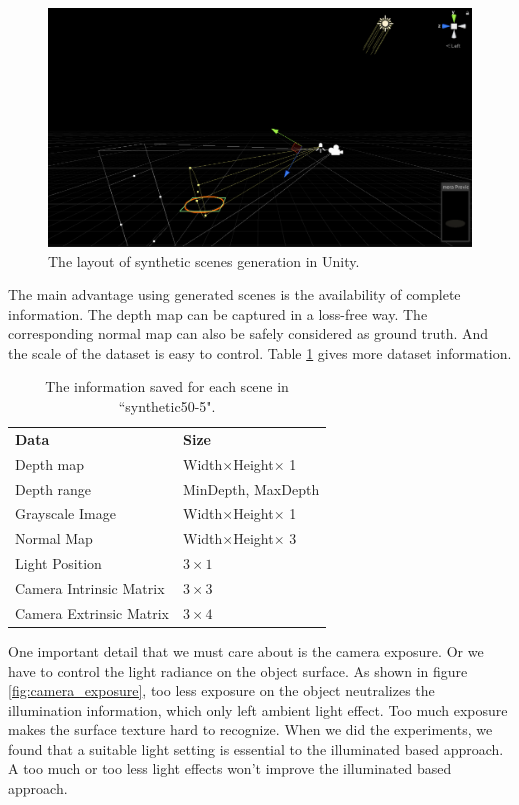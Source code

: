 \documentclass[border=15pt, multi, tikz]{article}
\newcommand{\tabhead}[1]{\textbf{#1}}
\begin{document}
\begin{figure}[h!]
	\centering
	\includegraphics[width=.99\textwidth]{./Figures/unity-workplace.PNG}
	\caption{The layout of synthetic scenes generation in Unity.}
	\label{fig:unity-workplace}
\end{figure}

The main advantage using generated scenes is the availability of complete information. The depth map can be captured in a loss-free way. The corresponding normal map can also be safely considered as ground truth. And the scale of the dataset is easy to control. Table \ref{tab:data-files} gives more dataset information.
\begin{table}
	\caption{The information saved for each scene in ``synthetic50-5".}
	\label{tab:data-files}
	\centering
	\begin{tabular}{l l}
		\tabhead{Data} & \tabhead{Size} \\
		Depth map & Width$ \times $Height$ \times $ 1 \\
		\hline 
		Depth range  & MinDepth, MaxDepth \\  
		\hline
		Grayscale Image	&  Width$ \times $Height$ \times $ 1 \\  
		\hline 
		Normal Map &   Width$ \times $Height$ \times $ 3  \\
		\hline 
		Light Position &  $ 3\times1 $  \\
		\hline
		Camera Intrinsic Matrix &  $ 3\times 3 $  \\
		\hline 
		Camera Extrinsic Matrix &  $ 3\times 4 $  \\
		\hline 
	\end{tabular}
\end{table}

One important detail that we must care about is the camera exposure. Or we have to control the light radiance on the object surface. As shown in figure \ref{fig:camera_exposure}, too less exposure on the object neutralizes the illumination information, which only left ambient light effect. Too much exposure makes the surface texture hard to recognize. When we did the experiments, we found that a suitable light setting is essential to the illuminated based approach. A too much or too less light effects won't improve the illuminated based approach.
\end{document}
